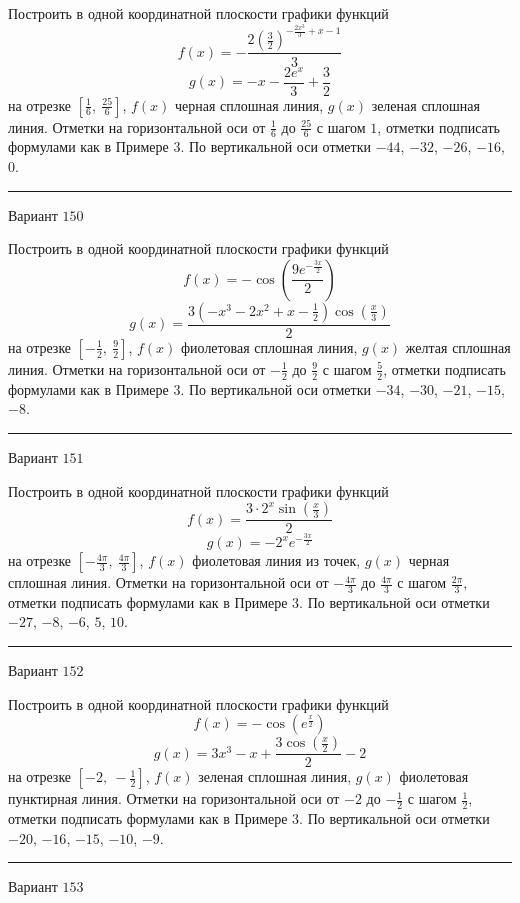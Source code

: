 \documentclass[11pt]{report}
\begin{document}
Построить в одной координатной плоскости графики функций $$f(x) = - \frac{2 \left(\frac{3}{2}\right)^{- \frac{2 x^{3}}{3} + x - 1}}{3}$$ $$g(x) = - x - \frac{2 e^{x}}{3} + \frac{3}{2}$$ на отрезке $\left[\frac{1}{6}, \  \frac{25}{6}\right]$, $f(x)$ черная сплошная линия, $g(x)$ зеленая сплошная линия. Отметки на горизонтальной оси от $\frac{1}{6}$ до $\frac{25}{6}$ с шагом $1$, отметки подписать формулами как в Примере 3. По вертикальной оси отметки $-44$, $-32$, $-26$, $-16$, $0$.
\begin{center}
\noindent\rule{8cm}{0.4pt}
\end{center}
Вариант $150$


Построить в одной координатной плоскости графики функций $$f(x) = - \cos{\left(\frac{9 e^{- \frac{3 x}{2}}}{2} \right)}$$ $$g(x) = \frac{3 \left(- x^{3} - 2 x^{2} + x - \frac{1}{2}\right) \cos{\left(\frac{x}{3} \right)}}{2}$$ на отрезке $\left[- \frac{1}{2}, \  \frac{9}{2}\right]$, $f(x)$ фиолетовая сплошная линия, $g(x)$ желтая сплошная линия. Отметки на горизонтальной оси от $- \frac{1}{2}$ до $\frac{9}{2}$ с шагом $\frac{5}{2}$, отметки подписать формулами как в Примере 3. По вертикальной оси отметки $-34$, $-30$, $-21$, $-15$, $-8$.
\begin{center}
\noindent\rule{8cm}{0.4pt}
\end{center}
Вариант $151$


Построить в одной координатной плоскости графики функций $$f(x) = \frac{3 \cdot 2^{x} \sin{\left(\frac{x}{3} \right)}}{2}$$ $$g(x) = - 2^{x} e^{- \frac{3 x}{2}}$$ на отрезке $\left[- \frac{4 \pi}{3}, \  \frac{4 \pi}{3}\right]$, $f(x)$ фиолетовая линия из точек, $g(x)$ черная сплошная линия. Отметки на горизонтальной оси от $- \frac{4 \pi}{3}$ до $\frac{4 \pi}{3}$ с шагом $\frac{2 \pi}{3}$, отметки подписать формулами как в Примере 3. По вертикальной оси отметки $-27$, $-8$, $-6$, $5$, $10$.
\begin{center}
\noindent\rule{8cm}{0.4pt}
\end{center}
Вариант $152$


Построить в одной координатной плоскости графики функций $$f(x) = - \cos{\left(e^{\frac{x}{2}} \right)}$$ $$g(x) = 3 x^{3} - x + \frac{3 \cos{\left(\frac{x}{2} \right)}}{2} - 2$$ на отрезке $\left[-2, \  - \frac{1}{2}\right]$, $f(x)$ зеленая сплошная линия, $g(x)$ фиолетовая пунктирная линия. Отметки на горизонтальной оси от $-2$ до $- \frac{1}{2}$ с шагом $\frac{1}{2}$, отметки подписать формулами как в Примере 3. По вертикальной оси отметки $-20$, $-16$, $-15$, $-10$, $-9$.
\begin{center}
\noindent\rule{8cm}{0.4pt}
\end{center}
Вариант $153$
\end{document}
